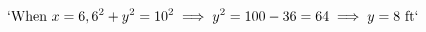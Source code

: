 \documentclass[preview]{standalone}
\begin{document}
\begin{align*}
`\text{When } x = 6, 6^2 + y^2 = 10^2 \implies y^2 = 100 - 36 = 64 \implies y = 8 \text{ ft}`
\end{align*}
\end{document}
